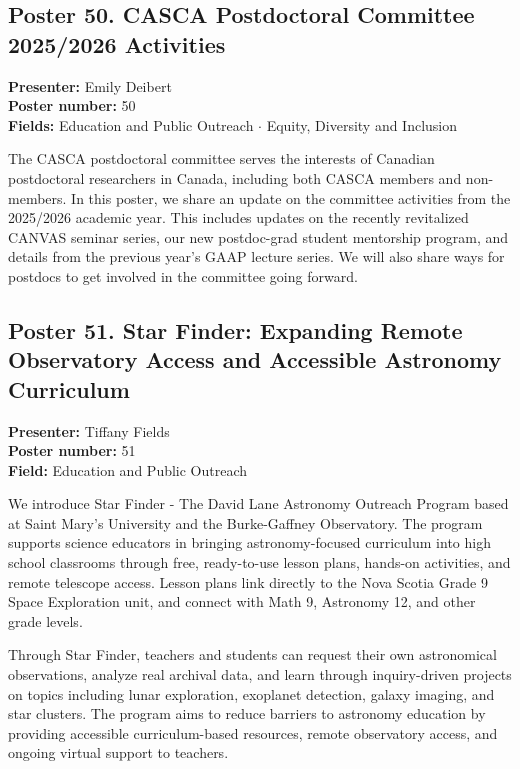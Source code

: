 \hypertarget{poster-abstract-talk-104}{}\label{poster-abstract-page-talk-104}
\subsection*{Poster 50. CASCA Postdoctoral Committee 2025/2026 Activities}
\textbf{Presenter:} Emily Deibert\\
\textbf{Poster number:} 50\\
\textbf{Fields:} Education and Public Outreach $\cdot$ Equity, Diversity and Inclusion

The CASCA postdoctoral committee serves the interests of Canadian postdoctoral researchers in Canada, including both CASCA members and non-members. In this poster, we share an update on the committee activities from the 2025/2026 academic year. This includes updates on the recently revitalized CANVAS seminar series, our new postdoc-grad student mentorship program, and details from the previous year's GAAP lecture series. We will also share ways for postdocs to get involved in the committee going forward.

\hypertarget{poster-abstract-talk-115}{}\label{poster-abstract-page-talk-115}
\subsection*{Poster 51. Star Finder: Expanding Remote Observatory Access and Accessible Astronomy Curriculum}
\textbf{Presenter:} Tiffany Fields\\
\textbf{Poster number:} 51\\
\textbf{Field:} Education and Public Outreach

We introduce Star Finder - The David Lane Astronomy Outreach Program based at Saint Mary's University and the Burke-Gaffney Observatory. The program supports science educators in bringing astronomy-focused curriculum into high school classrooms through free, ready-to-use lesson plans, hands-on activities, and remote telescope access. Lesson plans link directly to the Nova Scotia Grade 9 Space Exploration unit, and connect with Math 9, Astronomy 12, and other grade levels.

Through Star Finder, teachers and students can request their own astronomical observations, analyze real archival data, and learn through inquiry-driven projects on topics including lunar exploration, exoplanet detection, galaxy imaging, and star clusters. The program aims to reduce barriers to astronomy education by providing accessible curriculum-based resources, remote observatory access, and ongoing virtual support to teachers.

